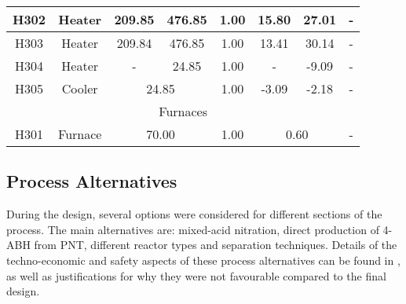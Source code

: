 \begin{table}[h]
{\begin{tabular}{|c|c|c|c|c|c|c|c|c|c|}
H302                  & \multicolumn{2}{c|}{Heater}                         & 209.85            & 476.85            & 1.00                            & 15.80            & 27.01            & \multicolumn{2}{c|}{-}                      \\ \hline
H303                  & \multicolumn{2}{c|}{Heater}                         & 209.84            & 476.85            & 1.00                            & 13.41            & 30.14            & \multicolumn{2}{c|}{-}                      \\ \hline
H304                  & \multicolumn{2}{c|}{Heater}                         & -                 & 24.85             & 1.00                            & -                & -9.09            & \multicolumn{2}{c|}{-}                      \\ \hline
H305                  & \multicolumn{2}{c|}{Cooler}                         & \multicolumn{2}{c|}{24.85}            & 1.00                            & -3.09            & -2.18            & \multicolumn{2}{c|}{-}                      \\ \hline
\multicolumn{10}{|c|}{Furnaces}                                                                                                                                                                                                           \\ \hline
H301                  & \multicolumn{2}{c|}{Furnace}                        & \multicolumn{2}{c|}{70.00}            & 1.00                            & \multicolumn{2}{c|}{0.60}           & \multicolumn{2}{c|}{-}                      \\ \hline
\end{tabular}%
}
\end{table}

\subsection{Process Alternatives}
During the design, several options were considered for different sections of the process. The main alternatives are: mixed-acid  nitration, direct production of 4-ABH from PNT, different reactor types and separation techniques. Details of the techno-economic and safety aspects of these process alternatives can be found in , as well as justifications for why they were not favourable compared to the final design.




